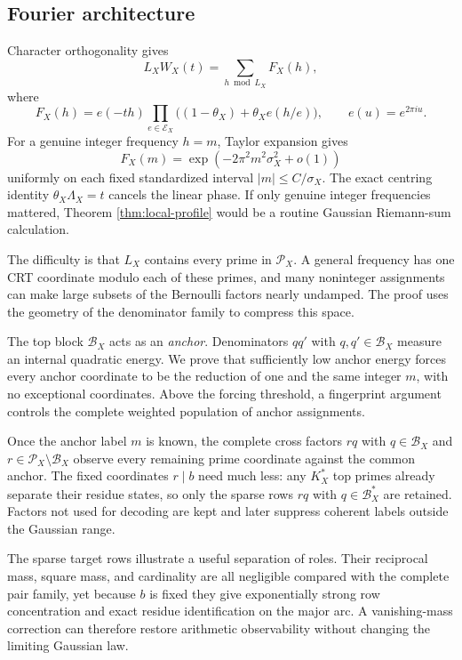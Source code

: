 \subsection{Fourier architecture}

Character orthogonality gives
\[
L_XW_X(t)
=
\sum_{h\bmod L_X}F_X(h),
\tag{1.15}\label{eq:1.15}
\]
where
\[
F_X(h)
=
e(-th)
\prod_{e\in\mathcal E_X}
\bigl((1-\theta_X)+\theta_Xe(h/e)\bigr),
\qquad
e(u)=e^{2\pi iu}.
\tag{1.16}\label{eq:1.16}
\]
For a genuine integer frequency $h=m$, Taylor expansion gives
\[
F_X(m)
=
\exp(-2\pi^2m^2\sigma_X^2+o(1))
\]
uniformly on each fixed standardized interval $|m|\le C/\sigma_X$. The exact centring identity $\theta_X\Lambda_X=t$ cancels the linear phase. If only genuine integer frequencies mattered, Theorem \ref{thm:local-profile} would be a routine Gaussian Riemann-sum calculation.

The difficulty is that $L_X$ contains every prime in $\mathcal P_X$. A general frequency has one CRT coordinate modulo each of these primes, and many noninteger assignments can make large subsets of the Bernoulli factors nearly undamped. The proof uses the geometry of the denominator family to compress this space.

The top block $\mathcal B_X$ acts as an \emph{anchor}. Denominators $qq'$ with $q,q'\in\mathcal B_X$ measure an internal quadratic energy. We prove that sufficiently low anchor energy forces every anchor coordinate to be the reduction of one and the same integer $m$, with no exceptional coordinates. Above the forcing threshold, a fingerprint argument controls the complete weighted population of anchor assignments.

Once the anchor label $m$ is known, the complete cross factors $rq$ with $q\in\mathcal B_X$ and $r\in\mathcal P_X\setminus\mathcal B_X$ observe every remaining prime coordinate against the common anchor. The fixed coordinates $r\mid b$ need much less: any $K_X^*$ top primes already separate their residue states, so only the sparse rows $rq$ with $q\in\mathcal B_X^*$ are retained. Factors not used for decoding are kept and later suppress coherent labels outside the Gaussian range.

The sparse target rows illustrate a useful separation of roles. Their reciprocal mass, square mass, and cardinality are all negligible compared with the complete pair family, yet because $b$ is fixed they give exponentially strong row concentration and exact residue identification on the major arc. A vanishing-mass correction can therefore restore arithmetic observability without changing the limiting Gaussian law.

